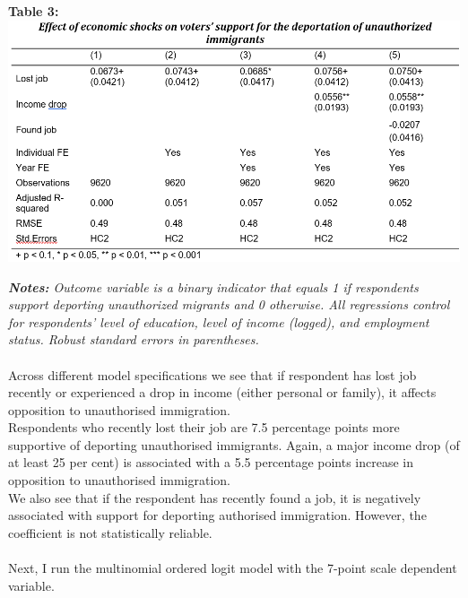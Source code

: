 \documentclass[12pt,letterpaper]{article}
\begin{document}
\begin{center}
	\textbf{Table 3:}
	\includegraphics{Table 2.png} 
\end{center}
\textit{\textbf{Notes:} Outcome variable is a binary indicator that equals 1 if respondents support deporting unauthorized migrants and 0 otherwise. All regressions control for respondents’ level of education, level of income (logged), and employment status. Robust standard errors in parentheses.}\\
\\Across different model specifications we see that if respondent has lost job recently or experienced a drop in income (either personal or family), it affects opposition to unauthorised immigration.\\
Respondents who recently lost their job are 7.5 percentage points more supportive of deporting unauthorised immigrants. Again, a major income drop (of at least 25 per cent) is associated with a 5.5 percentage points increase in opposition to unauthorised immigration.\\
We also see that if the respondent has recently found a job, it is negatively associated with support for deporting authorised immigration. However, the coefficient is not statistically reliable.\\
\pagebreak
\\Next, I run the multinomial ordered logit model with the 7-point scale dependent variable.

\end{document}
